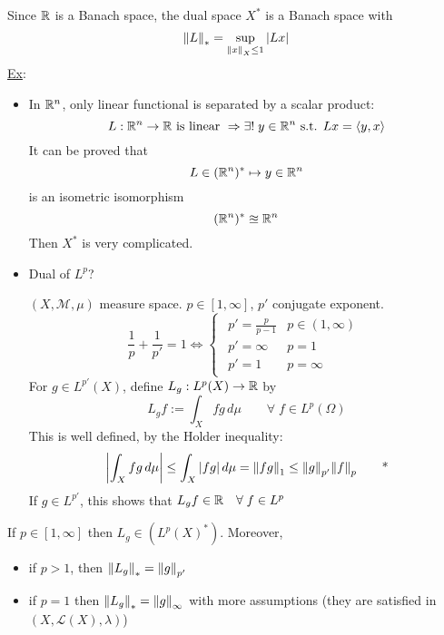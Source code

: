 Since \(\mathbb{R}\) is a Banach space, the dual space \(X^*\) is a Banach space with 
\[
    \norm{L}_* = \sup_{\norm{x}_X \leq 1} \abs{Lx}
\]
\noindent\underline{Ex}: 
\begin{itemize}
    \item In \(\mathbb{R}^n\), only linear functional is separated by a scalar product:
        \[
            L : \mathbb{R}^n \to \mathbb{R} \mbox{ is linear } \Rightarrow \exists ! \; y \in \mathbb{R}^n \mbox{ s.t. } Lx = \langle y,x \rangle
        \]
        It can be proved that 
        \[
            L \in (\mathbb{R}^n)^* \mapsto y \in \mathbb{R}^n
        \]
        is an isometric isomorphism 
        \[
            (\mathbb{R}^n)^* \approxeq \mathbb{R}^n
        \]
        Then \(X^*\) is very complicated.
    \item Dual of \(L^p\)?
    
    \(\left(X, \mathcal{M}, \mu\right)\) measure space. \(p \in \left[1, \infty\right]\), \(p'\) conjugate exponent.
    \[
        \frac{1}{p} + \frac{1}{p'} = 1 \iff 
        \begin{cases}
            \begin{array}{ll}
                p' = \frac{p}{p-1} & p \in (1, \infty) \\
                p' = \infty & p = 1 \\
                p'=1 & p = \infty
            \end{array}     
        \end{cases}
    \]
    For \(g \in L^{p'}(X)\), define \(L_g : L^p(X) \to \mathbb{R}\) by
    \[
        L_g f := \int_X fg \, d\mu \qquad \forall \; f \in L^p(\Omega)
    \]
    This is well defined, by the Holder inequality:
    \[
        \abs{\int_X fg \, d\mu } \leq \int_X \abs{fg} \, d\mu = \norm{fg}_1 \leq \norm{g}_{p'} \norm{f}_p \tag*{*} 
    \]
    If \(g \in L^{p'}\), this shows that \(L_g f \in \mathbb{R} \quad \forall \; f \in L^p\)
\end{itemize}

\begin{proposition}
    If \(p \in [1, \infty]\) then \(L_g \in (L^p(X)^*)\). Moreover, 
    \begin{itemize}
        \item if \(p > 1\), then \(\norm{L_g}_* = \norm{g}_{p'}\)
        \item if \(p=1\) then \(\norm{L_g}_* = \norm{g}_{\infty}\) with more assumptions (they are satisfied in \((X, \mathcal{L}(X), \lambda)\))
    \end{itemize}
\end{proposition}

